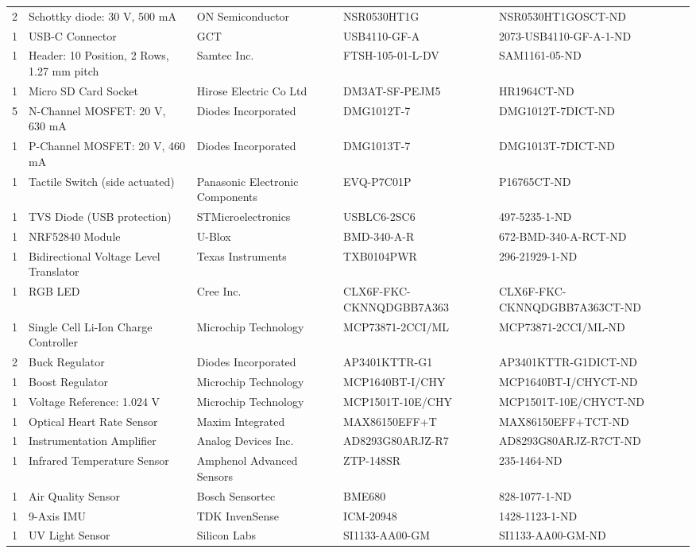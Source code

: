 \begin{center}
{\begin{longtable}{r|>{\raggedright}p{3cm}|>{\raggedright}p{2.5cm}|>{\raggedright}p{3cm}|>{\raggedright}p{3cm}l}
2 & Schottky diode: 30 V, 500 mA & ON Semiconductor & NSR0530HT1G & NSR0530HT1GOSCT-ND \tabularnewline
1 & USB-C Connector & GCT & USB4110-GF-A & 2073-USB4110-GF-A-1-ND \tabularnewline
1 & Header: 10 Position, 2 Rows, 1.27 mm pitch & Samtec Inc. & FTSH-105-01-L-DV & SAM1161-05-ND \tabularnewline
1 & Micro SD Card Socket & Hirose Electric Co Ltd & DM3AT-SF-PEJM5 & HR1964CT-ND \tabularnewline
5 & N-Channel MOSFET: 20 V, 630 mA & Diodes Incorporated & DMG1012T-7 & DMG1012T-7DICT-ND \tabularnewline
1 & P-Channel MOSFET: 20 V, 460 mA & Diodes Incorporated & DMG1013T-7 & DMG1013T-7DICT-ND \tabularnewline
1 & Tactile Switch (side actuated) & Panasonic Electronic Components & EVQ-P7C01P & P16765CT-ND \tabularnewline
1 & TVS Diode (USB protection) & STMicroelectronics & USBLC6-2SC6 & 497-5235-1-ND \tabularnewline
1 & NRF52840 Module & U-Blox & BMD-340-A-R & 672-BMD-340-A-RCT-ND \tabularnewline
1 & Bidirectional Voltage Level Translator & Texas Instruments & TXB0104PWR & 296-21929-1-ND \tabularnewline
1 & RGB LED & Cree Inc. & CLX6F-FKC-CKNNQDGBB7A363 & CLX6F-FKC-CKNNQDGBB7A363CT-ND \tabularnewline
1 & Single Cell Li-Ion Charge Controller & Microchip Technology & MCP73871-2CCI/ML & MCP73871-2CCI/ML-ND \tabularnewline
2 & Buck Regulator & Diodes Incorporated & AP3401KTTR-G1 & AP3401KTTR-G1DICT-ND \tabularnewline
1 & Boost Regulator & Microchip Technology & MCP1640BT-I/CHY & MCP1640BT-I/CHYCT-ND \tabularnewline
1 & Voltage Reference: 1.024 V & Microchip Technology & MCP1501T-10E/CHY & MCP1501T-10E/CHYCT-ND \tabularnewline
1 & Optical Heart Rate Sensor & Maxim Integrated & MAX86150EFF+T & MAX86150EFF+TCT-ND \tabularnewline
1 & Instrumentation Amplifier & Analog Devices Inc. & AD8293G80ARJZ-R7 & AD8293G80ARJZ-R7CT-ND \tabularnewline
1 & Infrared Temperature Sensor & Amphenol Advanced Sensors & ZTP-148SR & 235-1464-ND \tabularnewline
1 & Air Quality Sensor & Bosch Sensortec & BME680 & 828-1077-1-ND \tabularnewline
1 & 9-Axis IMU & TDK InvenSense & ICM-20948 & 1428-1123-1-ND \tabularnewline
1 & UV Light Sensor & Silicon Labs & SI1133-AA00-GM & SI1133-AA00-GM-ND \tabularnewline
\bottomrule
\end{longtable}
}
\end{center}
